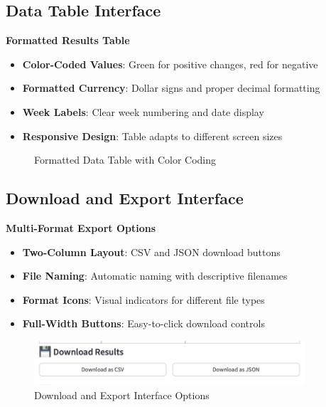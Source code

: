 \subsection{Data Table Interface}

\textbf{Formatted Results Table}

\begin{itemize}
    \item \textbf{Color-Coded Values}: Green for positive changes, red for negative
    \item \textbf{Formatted Currency}: Dollar signs and proper decimal formatting
    \item \textbf{Week Labels}: Clear week numbering and date display
    \item \textbf{Responsive Design}: Table adapts to different screen sizes
\end{itemize}

\begin{figure}[H]
    \centering
    \caption{Formatted Data Table with Color Coding}
    \label{fig:data_table}
\end{figure}

\subsection{Download and Export Interface}

\textbf{Multi-Format Export Options}

\begin{itemize}
    \item \textbf{Two-Column Layout}: CSV and JSON download buttons
    \item \textbf{File Naming}: Automatic naming with descriptive filenames
    \item \textbf{Format Icons}: Visual indicators for different file types
    \item \textbf{Full-Width Buttons}: Easy-to-click download controls
\end{itemize}

\begin{figure}[H]
    \centering
    \includegraphics[width=0.9\textwidth]{Images/04GUIAndUserInterface/DownloadInterface.png}
    \caption{Download and Export Interface Options}
    \label{fig:download_interface}
\end{figure}

